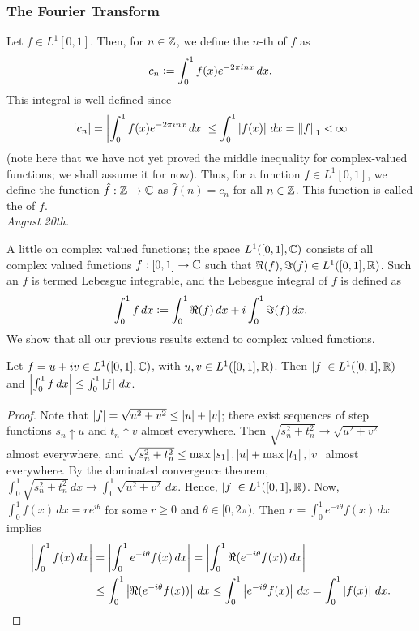 \subsubsection{The Fourier Transform}
Let $f \in L^{1}[0,1]$. Then, for $n \in \mathbb{Z}$, we define the $n$-th  of $f$ as
\begin{align}
    c_{n} \vcentcolon= \int_{0}^{1} f(x) e^{-2\pi i n x} \, dx.
\end{align}
This integral is well-defined since
\begin{align}
    \left| c_{n} \right| = \left| \int_{0}^{1} f(x) e^{-2\pi i n x} \, dx \right| \leq \int_{0}^{1} \left| f(x) \right| \, dx = \left\lVert f\right\rVert_{1} < \infty
\end{align}
(note here that we have not yet proved the middle inequality for complex-valued functions; we shall assume it for now). Thus, for a function $f \in L^{1}[0,1]$, we define the function $\hat{f}:\mathbb{Z} \to \mathbb{C}$ as $\hat{f}(n) = c_{n}$ for all $n \in \mathbb{Z}$. This function is called the  of $f$.
\\

\noindent \textit{August 20th.}

A little on complex valued functions; the space $L^{1}([0,1],\mathbb{C})$ consists of all complex valued functions $f:[0,1] \to \mathbb{C}$ such that $\Re(f),\Im(f) \in L^{1}([0,1],\mathbb{R})$. Such an $f$ is termed Lebesgue integrable, and the Lebesgue integral of $f$ is defined as
\begin{align}
    \int_{0}^{1} f \, dx \vcentcolon= \int_{0}^{1} \Re(f) \, dx + i\int_{0}^{1} \Im(f) \, dx.
\end{align}
We show that all our previous results extend to complex valued functions.

\begin{proposition}
    Let $f=u+iv \in L^{1}([0,1],\mathbb{C})$, with $u,v \in L^{1}([0,1],\mathbb{R})$. Then $\left| f \right| \in L^{1}([0,1],\mathbb{R})$ and $\left| \int_{0}^{1} f \, dx \right| \leq \int_{0}^{1} \left| f \right| \, dx$.
\end{proposition}
\begin{proof}
    Note that $\left| f \right| = \sqrt{u^{2}+v^{2}} \leq \left| u \right|+\left| v \right|$; there exist sequences of step functions $s_{n} \uparrow u$ and $t_{n} \uparrow v$ almost everywhere. Then $\sqrt{s_{n}^{2}+t_{n}^{2}} \to \sqrt{u^{2}+v^{2}}$ almost everywhere, and $\sqrt{s_{n}^{2}+t_{n}^{2}} \leq \max{\left| s_{1} \right|,\left| u \right|}+\max{\left| t_{1} \right|,\left| v \right|}$ almost everywhere. By the dominated convergence theorem, $\int_{0}^{1} \sqrt{s_{n}^{2}+t_{n}^{2}} \, dx \to \int_{0}^{1} \sqrt{u^{2}+v^{2}} \, dx$. Hence, $\left| f \right| \in L^{1}([0,1],\mathbb{R})$. Now, $\int_{0}^{1} f(x) \, dx = re^{i\theta}$ for some $r \geq 0$ and $\theta \in [0,2\pi)$. Then $r = \int_{0}^{1} e^{-i\theta}f(x) \, dx$ implies
    \begin{align}
        \left| \int_{0}^{1} f(x) \, dx \right| &= \left| \int_{0}^{1} e^{-i\theta}f(x) \, dx \right| = \left| \int_{0}^{1} \Re(e^{-i\theta}f(x)) \, dx \right| \notag \\ &\leq \int_{0}^{1} \left| \Re(e^{-i\theta}f(x)) \right| \, dx \leq \int_{0}^{1} \left| e^{-i\theta}f(x) \right| \, dx = \int_{0}^{1} \left| f(x) \right| \, dx.
    \end{align}
\end{proof}

